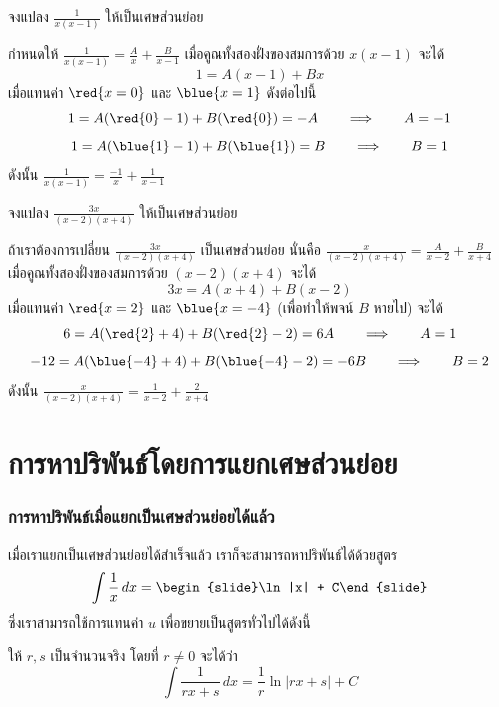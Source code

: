 \begin{frame}[t]
\begin{ex} 
จงแปลง $\frac{1}{x(x-1)}$ ให้เป็นเศษส่วนย่อย \label{ex:partial_fraction1}
\end{ex}
\begin{sol}
กำหนดให้  $\frac{1}{x(x-1)} = \frac{A}{x} + \frac{B}{x-1}$ \pa
เมื่อคูณทั้งสองฝั่งของสมการด้วย $x(x-1)$ จะได้ \pa
\[1 = A(x-1) + Bx \] \pa
เมื่อแทนค่า $\red{x=0}$ และ $\blue{x=1}$ ดังต่อไปนี้ \pa
\[ 1 = A(\red{0}-1) + B (\red{0})= -A \qquad  \Longrightarrow \qquad A = -1\] 
\[1 = A(\blue{1}-1) + B(\blue{ 1}) = B \qquad \Longrightarrow \qquad B = 1\]  
ดังนั้น $ \frac{1}{x(x-1)} = \frac{-1}{x} + \frac{1}{x-1}$
\end{sol}
\end{frame}


\begin{frame}[t]
\begin{ex}
จงแปลง $\frac{3x}{(x-2)(x+4)}$ ให้เป็นเศษส่วนย่อย \label{ex:partial_fraction2}
\end{ex}
\begin{sol}
ถ้าเราต้องการเปลี่ยน $\frac{3x}{(x-2)(x+4)}$ เป็นเศษส่วนย่อย นั่นคือ $\frac{x}{(x-2)(x+4)} = \frac{A}{x-2} + \frac{B}{x+4}$ \pa
เมื่อคูณทั้งสองฝั่งของสมการด้วย $(x-2)(x+4)$ จะได้ \pa 
\[3x = A(x+4) + B(x-2) \] \pa
เมื่อแทนค่า $\red{x=2}$ และ $\blue{x=-4}$ (เพื่อทำให้พจน์ $B$ หายไป) จะได้\pa 
\[6 = A(\red{2}+4) + B(\red{2}-2) = 6A \qquad \Longrightarrow \qquad A = 1\] 
\[-12 = A(\blue{-4}+4) + B(\blue{-4}-2) = -6B \qquad \Longrightarrow \qquad B = 2\] 
ดังนั้น $ \frac{x}{(x-2)(x+4)} = \frac{1}{x-2} + \frac{2}{x+4}$
\end{sol}
\end{frame}


\section{การหาปริพันธ์โดยการแยกเศษส่วนย่อย}
\frame{\sectionpage}

\begin{frame}
\frametitle{การหาปริพันธ์เมื่อแยกเป็นเศษส่วนย่อยได้แล้ว}
เมื่อเราแยกเป็นเศษส่วนย่อยได้สำเร็จแล้ว เราก็จะสามารถหาปริพันธ์ได้ด้วยสูตร
\[ \int \frac{1}{x} \, dx = \begin{slide}\ln |x| + C\end{slide} \] \pa
ซึ่งเราสามารถใช้การแทนค่า $u$ เพื่อขยายเป็นสูตรทั่วไปได้ดังนี้ \pa
\begin{thm}{}{}
ให้ $r,s$ เป็นจำนวนจริง โดยที่ $r \neq 0$ จะได้ว่า
\begin{equation} \label{eq:integral_fraction}
 \int \frac{1}{rx + s} \, dx = \frac{1}{r} \ln |rx+s| + C
 \end{equation}
\end{thm}
\end{frame}

